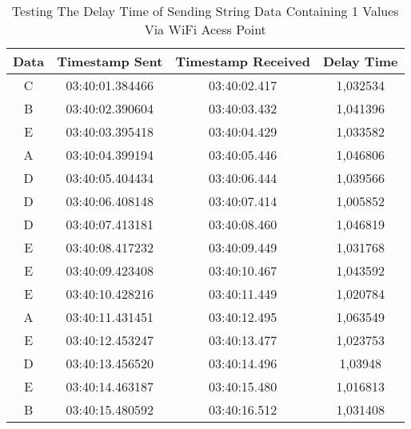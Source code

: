 \begin{table}[!ht]
  \centering
  \caption{Testing The Delay Time of Sending String Data Containing 1 Values Via WiFi Acess Point}
  \label{tbl:delayWiFi1}
  \begin{tabular}{|ccc|c|}
  \hline
  \multicolumn{1}{|c|}{Data} & \multicolumn{1}{c|}{Timestamp Sent}  & Timestamp Received & Delay Time \\ \hline
  \multicolumn{1}{|c|}{C}    & \multicolumn{1}{c|}{03:40:01.384466} & 03:40:02.417       & 1,032534   \\ \hline
  \multicolumn{1}{|c|}{B}    & \multicolumn{1}{c|}{03:40:02.390604} & 03:40:03.432       & 1,041396   \\ \hline
  \multicolumn{1}{|c|}{E}    & \multicolumn{1}{c|}{03:40:03.395418} & 03:40:04.429       & 1,033582   \\ \hline
  \multicolumn{1}{|c|}{A}    & \multicolumn{1}{c|}{03:40:04.399194} & 03:40:05.446       & 1,046806   \\ \hline
  \multicolumn{1}{|c|}{D}    & \multicolumn{1}{c|}{03:40:05.404434} & 03:40:06.444       & 1,039566   \\ \hline
  \multicolumn{1}{|c|}{D}    & \multicolumn{1}{c|}{03:40:06.408148} & 03:40:07.414       & 1,005852   \\ \hline
  \multicolumn{1}{|c|}{D}    & \multicolumn{1}{c|}{03:40:07.413181} & 03:40:08.460       & 1,046819   \\ \hline
  \multicolumn{1}{|c|}{E}    & \multicolumn{1}{c|}{03:40:08.417232} & 03:40:09.449       & 1,031768   \\ \hline
  \multicolumn{1}{|c|}{E}    & \multicolumn{1}{c|}{03:40:09.423408} & 03:40:10.467       & 1,043592   \\ \hline
  \multicolumn{1}{|c|}{E}    & \multicolumn{1}{c|}{03:40:10.428216} & 03:40:11.449       & 1,020784   \\ \hline
  \multicolumn{1}{|c|}{A}    & \multicolumn{1}{c|}{03:40:11.431451} & 03:40:12.495       & 1,063549   \\ \hline
  \multicolumn{1}{|c|}{E}    & \multicolumn{1}{c|}{03:40:12.453247} & 03:40:13.477       & 1,023753   \\ \hline
  \multicolumn{1}{|c|}{D}    & \multicolumn{1}{c|}{03:40:13.456520} & 03:40:14.496       & 1,03948    \\ \hline
  \multicolumn{1}{|c|}{E}    & \multicolumn{1}{c|}{03:40:14.463187} & 03:40:15.480       & 1,016813   \\ \hline
  \multicolumn{1}{|c|}{B}    & \multicolumn{1}{c|}{03:40:15.480592} & 03:40:16.512       & 1,031408   \\ \hline

\end{tabular}
\end{table}
